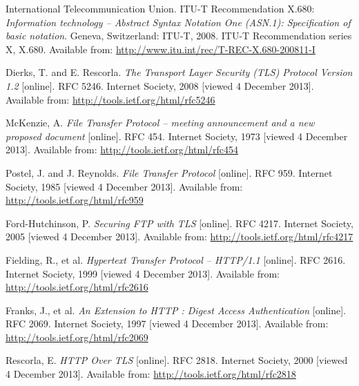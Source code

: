 
\def\bibname{Bibliography}
\begin{thebibliography}{99}
\addcontentsline{toc}{chapter}{\bibname}


	{\sc International Telecommunication Union}.
	ITU-T Recommendation X.680:
	\emph{Information technology -- Abstract Syntax Notation One (ASN.1): Specification of basic notation}.
	Geneva, Switzerland: ITU-T, 2008.
	ITU-T Recommendation series X, X.680.
	Available from: \url{http://www.itu.int/rec/T-REC-X.680-200811-I}

	{\sc Dierks,} T. and E. {\sc Rescorla}.
	\emph{The Transport Layer Security (TLS) Protocol Version 1.2}
	[online].
	RFC 5246.
	Internet Society, 2008 [viewed 4 December 2013].
	Available from: \url{http://tools.ietf.org/html/rfc5246}


	{\sc McKenzie,} A.
	\emph{File Transfer Protocol -- meeting announcement and a new proposed document}
	[online].
	RFC 454.
	Internet Society, 1973 [viewed 4 December 2013].
	Available from: \url{http://tools.ietf.org/html/rfc454}

	{\sc Postel,} J. and J. {\sc Reynolds}.
	\emph{File Transfer Protocol}
	[online].
	RFC 959.
	Internet Society, 1985 [viewed 4 December 2013].
	Available from: \url{http://tools.ietf.org/html/rfc959}

	{\sc Ford-Hutchinson,} P.
	\emph{Securing FTP with TLS}
	[online].
	RFC 4217.
	Internet Society, 2005 [viewed 4 December 2013].
	Available from: \url{http://tools.ietf.org/html/rfc4217}

	{\sc Fielding,} R., et al.
	\emph{Hypertext Transfer Protocol -- HTTP/1.1}
	[online].
	RFC 2616.
	Internet Society, 1999 [viewed 4 December 2013].
	Available from: \url{http://tools.ietf.org/html/rfc2616}

	{\sc Franks,} J., et al.
	\emph{An Extension to HTTP : Digest Access Authentication}
	[online].
	RFC 2069.
	Internet Society, 1997 [viewed 4 December 2013].
	Available from: \url{http://tools.ietf.org/html/rfc2069}

	{\sc Rescorla,} E.
	\emph{HTTP Over TLS}
	[online].
	RFC 2818.
	Internet Society, 2000 [viewed 4 December 2013].
	Available from: \newline \url{http://tools.ietf.org/html/rfc2818}


\end{thebibliography}
